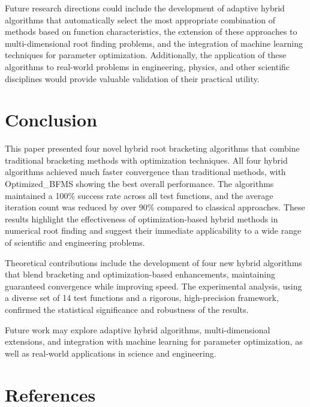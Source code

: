 \documentclass[amsmath, amssymb, aps]{revtex4-2}
\begin{document}
Future research directions could include the development of adaptive hybrid algorithms that automatically select the most appropriate combination of methods based on function characteristics, the extension of these approaches to multi-dimensional root finding problems, and the integration of machine learning techniques for parameter optimization. Additionally, the application of these algorithms to real-world problems in engineering, physics, and other scientific disciplines would provide valuable validation of their practical utility.

\section{Conclusion}\label{sec:conclusion}

This paper presented four novel hybrid root bracketing algorithms that combine traditional bracketing methods with optimization techniques. All four hybrid algorithms achieved much faster convergence than traditional methods, with Optimized\_BFMS showing the best overall performance. The algorithms maintained a 100\% success rate across all test functions, and the average iteration count was reduced by over 90\% compared to classical approaches. These results highlight the effectiveness of optimization-based hybrid methods in numerical root finding and suggest their immediate applicability to a wide range of scientific and engineering problems.

Theoretical contributions include the development of four new hybrid algorithms that blend bracketing and optimization-based enhancements, maintaining guaranteed convergence while improving speed. The experimental analysis, using a diverse set of 14 test functions and a rigorous, high-precision framework, confirmed the statistical significance and robustness of the results.

Future work may explore adaptive hybrid algorithms, multi-dimensional extensions, and integration with machine learning for parameter optimization, as well as real-world applications in science and engineering.

\section*{References}
\end{document}

